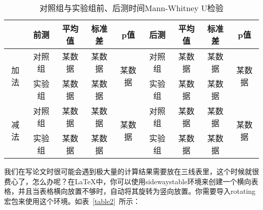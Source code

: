 \begin{table}[H]
	\centering
	\caption{对照组与实验组前、后测时间Mann-Whitney U检验}
	\begin{threeparttable}
		\begin{tabular}{c c c c c c c c c}
			\toprule[1.5pt]
			& 前测 & 平均值 & 标准差  & p值 & 后测 & 平均值 & 标准差  & p值 \\
			\midrule[1pt]
			
			
			\multirow{2}{*}{加法} & 对照组 & 某数据 & 某数据 & \multirow{2}{*}{某数据} & 对照组 & 某数据 & 某数据 & \multirow{2}{*}{某数据} \\
			
			& 实验组 & 某数据 & 某数据 &  & 实验组 & 某数据 & 某数据     \\
			
			\multirow{2}{*}{减法} & 对照组 & 某数据 & 某数据  & \multirow{2}{*}{某数据} & 对照组 & 某数据 & 某数据  & \multirow{2}{*}{某数据} \\
			
			& 实验组 & 某数据 & 某数据 &    & 实验组 & 某数据 & 某数据     \\
			\toprule[1.5pt]
		\end{tabular}
		\label{table3}
	\end{threeparttable}
\end{table}

我们在写论文时很可能会遇到极大量的计算结果需要放在三线表里，这个时候就很费心了，怎么办呢？在LaTeX中，你可以使用sidewaystable环境来创建一个横向表格，并且当表格横向放置不够时，自动将其旋转为竖向放置。你需要导入rotating宏包来使用这个环境。如表~\ref{table2}~所示：

